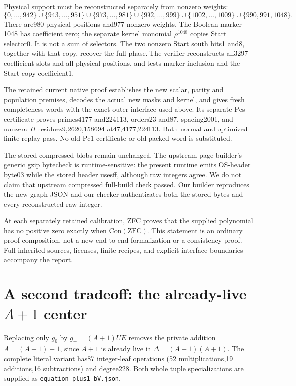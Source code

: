 Physical support must be reconstructed separately from nonzero weights:
\[
 \{0,\ldots,942\}\cup\{943,\ldots,951\}\cup\{973,\ldots,981\}
 \cup\{992,\ldots,999\}\cup\{1002,\ldots,1009\}\cup\{990,991,1048\}.
\]
There are980 physical positions and977 nonzero weights. The Boolean marker
1048 has coefficient zero; the separate kernel monomial $\rho^{1048}$
copies Start selector0. It is not a sum of selectors. The two nonzero
Start south bits1 and8, together with that copy, recover the full phase.
The verifier reconstructs all3297 coefficient slots and all physical
positions, and tests marker inclusion and the Start-copy coefficient1.

The retained current native proof establishes the new scalar, parity and
population premises, decodes the actual new masks and kernel, and gives
fresh completeness words with the exact outer interface used above.
Its separate Pcs certificate proves primes4177 and224113, orders23 and87,
spacing2001, and nonzero $H$ residues9,2620,158694 at47,4177,224113.
Both normal and optimized finite replay pass. No old Pc1 certificate or
old packed word is substituted.

The stored compressed blobs remain unchanged. The upstream page builder's
generic gzip bytecheck is runtime-sensitive: the present runtime emits
OS-header byte03 while the stored header usesff, although raw integers
agree. We do not claim that upstream compressed full-build check passed.
Our builder reproduces the new graph JSON and our checker authenticates
both the stored bytes and every reconstructed raw integer.

At each separately retained calibration, ZFC proves that the supplied
polynomial has no positive zero exactly when $\mathrm{Con}(\mathrm{ZFC})$.
This statement is an ordinary proof composition, not a new end-to-end
formalization or a consistency proof. Full inherited sources, licenses,
finite recipes, and explicit interface boundaries accompany the report.

\section{A second tradeoff: the already-live \texorpdfstring{$A+1$}{A+1} center}
Replacing only $g_0$ by $g_+=(A+1)UE$ removes the private addition
$A=(A-1)+1$, since $A+1$ is already live in $\Delta=(A-1)(A+1)$.
The complete literal variant has87 integer-leaf operations
(52 multiplications,19 additions,16 subtractions) and degree228.
Both whole tuple specializations are supplied as
\texttt{equation\_plus1\_bV.json}.


